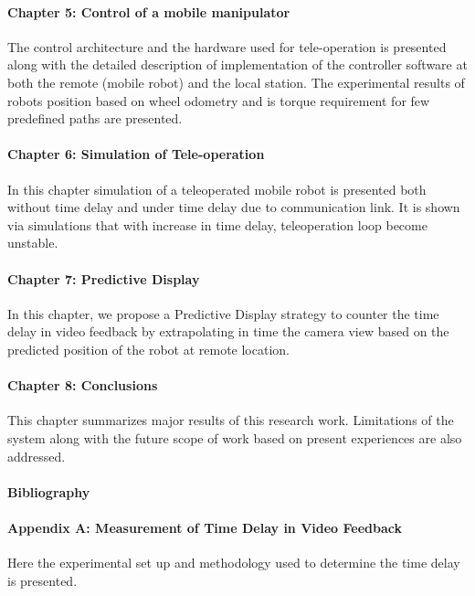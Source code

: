 \paragraph*{Chapter 5: Control of a mobile manipulator \\}
The control architecture and the hardware used for tele-operation is presented along with the detailed description of implementation of the controller software at both the remote (mobile robot)  and the local station. The experimental results of robots position based on wheel odometry and is torque requirement for few predefined paths are presented. 

\paragraph*{Chapter 6: Simulation of Tele-operation \\}
In this chapter simulation of a teleoperated mobile robot is presented both without time delay and  under time delay due to communication link. It is shown via simulations that with increase in time delay,  teleoperation loop become unstable. 
 
\paragraph*{Chapter 7: Predictive Display \\}
In this chapter,  we propose a Predictive Display strategy to counter the time delay in video feedback by extrapolating in time  the camera view based on the predicted position of the robot at remote location. 

\paragraph*{Chapter 8: Conclusions\\}
This chapter summarizes major results of this research work. Limitations of the system along with the future scope of work based on present experiences are also addressed.


\paragraph*{Bibliography}
\paragraph*{Appendix A:  Measurement of Time Delay in Video Feedback  \\}
Here the experimental set up and methodology used to determine the time delay is presented.
